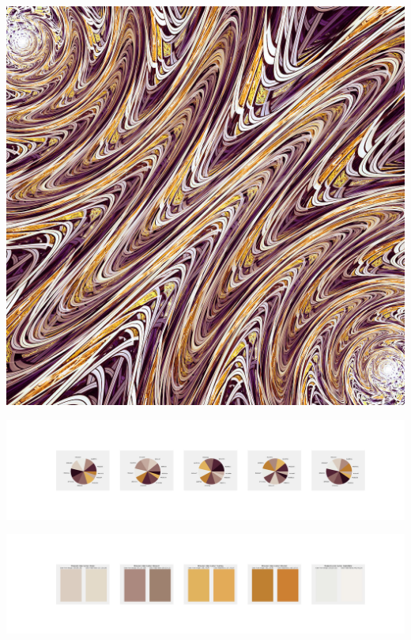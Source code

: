 \documentclass[11pt]{article}
\begin{document}
\begin{landscape}
    \begin{center}
    \includegraphics[width=\textwidth]{./nbimg/file (433).jpg}
    \end{center}

    \begin{center}
    \includegraphics[width=250mm]{./nbimg/pie-371.jpg}
    \end{center}

    \begin{center}
    \includegraphics[width=250mm]{./nbimg/peak-371.jpg}
    \end{center}
    


\end{landscape}
\end{document}

